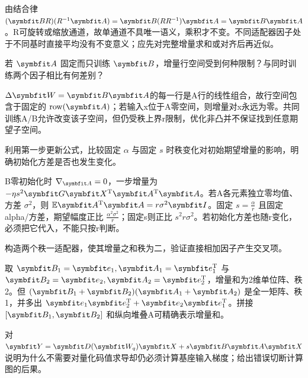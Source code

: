 \begin{exercises}
\begin{exercise}
\begin{solution}
由结合律 $(\mat{B}R)(R^{-1}\mat{A})=\mat{B}(RR^{-1})\mat{A}=\mat{B}\mat{A}$。R可旋转或缩放通道，故单通道不具唯一语义，乘积才不变。不同适配器因子处于不同基时直接平均没有不变意义；应先对完整增量求和或对齐后再近似。
\end{solution}
\end{exercise}

\begin{exercise}\optional 若 $\mat{A}$ 固定而只训练 $\mat{B}$，增量行空间受到何种限制？与同时训练两个因子相比有何差别？

\begin{solution}
$\Delta \mat{W}=\mat{B}\mat{A}$的每一行是A行的线性组合，故行空间包含于固定的 $\operatorname{row}(\mat{A})$；若输入x位于A零空间，则增量对x永远为零。共同训练A/B允许改变该子空间，但仍受秩上界r限制，优化非凸并不保证找到任意期望子空间。
\end{solution}
\end{exercise}

\begin{exercise} 利用第一步更新公式，比较固定 $\alpha$ 与固定 $s$ 时秩变化对初始期望增量的影响，明确初始化方差是否也发生变化。

\begin{solution}
B零初始化时 $\nabla_{\mat{A}}=0$，一步增量为 $-\eta s^2\mat{G}\mat{X}^{\mathrm{T}}\mat{A}^{\mathrm{T}}\mat{A}$。若A各元素独立零均值、方差 $\sigma^2$，则 $\mathbb E \mat{A}^{\mathrm{T}}\mat{A}=r\sigma^2\mat{I}$。固定 $s=\frac{\alpha}{r}$ 且固定alpha/方差，期望幅度正比 $\frac{\alpha^2\sigma^2}{r}$；固定s则正比 $s^2r\sigma^2$。若初始化方差也随r变化，必须把它代入，不能只按r判断。
\end{solution}
\end{exercise}

\begin{exercise} 构造两个秩一适配器，使其增量之和秩为二，验证直接相加因子产生交叉项。

\begin{solution}
取 $\mat{B}_1=\vect{e}_1,\mat{A}_1=\vect{e}_1^{\mathrm{T}}$ 与 $\mat{B}_2=\vect{e}_2,\mat{A}_2=\vect{e}_2^{\mathrm{T}}$，增量和为2维单位阵、秩2。但 $(\mat{B}_1+\mat{B}_2)(\mat{A}_1+\mat{A}_2)$ 是全一矩阵、秩1，并多出 $\vect{e}_1\vect{e}_2^{\mathrm{T}}+\vect{e}_2\vect{e}_1^{\mathrm{T}}$。拼接 $[\mat{B}_1,\mat{B}_2]$ 和纵向堆叠A可精确表示增量和。
\end{solution}
\end{exercise}

\begin{exercise} 对 $\mat{Y}=\mat{D}(\mat{W}_q)\mat{X}+s\mat{B}\mat{A}\mat{X}$ 说明为什么不需要对量化码值求导却仍必须计算基座输入梯度；给出错误切断计算图的后果。


\end{exercise}
\end{exercises}
